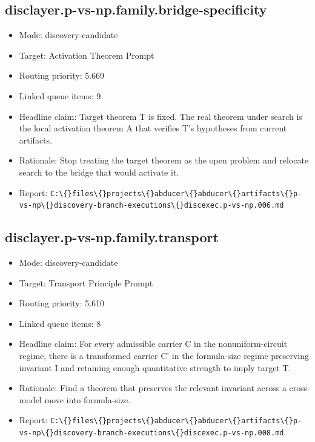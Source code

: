 \documentclass[11pt]{article}
\begin{document}
\subsection*{disclayer.p-vs-np.family.bridge-specificity}
\begin{itemize}
\item Mode: discovery-candidate
\item Target: Activation Theorem Prompt
\item Routing priority: 5.669
\item Linked queue items: 9
\item Headline claim: Target theorem T is fixed. The real theorem under search is the local activation theorem A that verifies T's hypotheses from current artifacts.
\item Rationale: Stop treating the target theorem as the open problem and relocate search to the bridge that would activate it.
\item Report: \texttt{C:\textbackslash\{\}files\textbackslash\{\}projects\textbackslash\{\}abducer\textbackslash\{\}abducer\textbackslash\{\}artifacts\textbackslash\{\}p-vs-np\textbackslash\{\}discovery-branch-executions\textbackslash\{\}discexec.p-vs-np.006.md}
\end{itemize}

\subsection*{disclayer.p-vs-np.family.transport}
\begin{itemize}
\item Mode: discovery-candidate
\item Target: Transport Principle Prompt
\item Routing priority: 5.610
\item Linked queue items: 8
\item Headline claim: For every admissible carrier C in the nonuniform-circuit regime, there is a transformed carrier C' in the formula-size regime preserving invariant I and retaining enough quantitative strength to imply target T.
\item Rationale: Find a theorem that preserves the relevant invariant across a cross-model move into formula-size.
\item Report: \texttt{C:\textbackslash\{\}files\textbackslash\{\}projects\textbackslash\{\}abducer\textbackslash\{\}abducer\textbackslash\{\}artifacts\textbackslash\{\}p-vs-np\textbackslash\{\}discovery-branch-executions\textbackslash\{\}discexec.p-vs-np.008.md}
\end{itemize}
\end{document}

